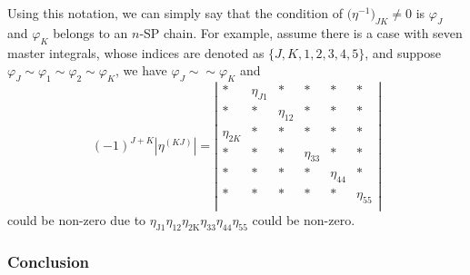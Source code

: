 \documentclass[a4paper,11pt]{article}
\begin{document}
Using this notation, we can simply say that the  condition of $\big( \eta^{-1} \big)_{JK}\neq 0$  is  $\varphi_J$ and $\varphi_K$ belongs to an $n$-SP chain.
For example, assume there is a case with seven master integrals, whose indices are denoted as $\{J,K,1,2,3,4,5\}$,  and suppose $\varphi_J\sim\varphi_1\sim\varphi_2\sim\varphi_K$, we have  $\varphi_J\sim\sim\varphi_K$ and 
\begin{equation}
(-1)^{J+K}|\eta^{(KJ)}| = \left|
\begin{array}{cccccc}
 * & \eta _{J1} & * & * & * & *
   \\
 * & * & \eta _{12} & * & * & * \\
 \eta _{2K} & * & * & * & * & * \\
 * & * & * & \eta _{33} & * & * \\
 * & * & * & * & \eta _{44} & * \\
 * & * & * & * & * & \eta _{55} \\
\end{array}
\right|
\end{equation}
could be non-zero due to $\eta _{\text{J}1}\eta _{12}\eta _{2\text{K}}\eta _{33}\eta _{44}\eta _{55}$ could be non-zero.


\subsubsection{Conclusion}
\end{document}
